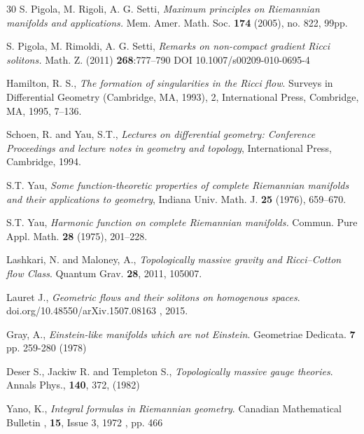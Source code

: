 \documentclass{amsart}
\theoremstyle{plain}
\numberwithin{equation}{section}
\begin{document}
\begin{thebibliography}{30}
S. Pigola, M. Rigoli, A. G. Setti, {\em Maximum
principles on Riemannian manifolds and applications.} Mem. Amer. Math. Soc. \textbf{ 174} (2005), no. 822, 99pp.

S. Pigola, M. Rimoldi, A. G. Setti, {\em Remarks on non-compact gradient Ricci solitons.} Math. Z. (2011) \textbf{268}:777--790 DOI 10.1007/s00209-010-0695-4

Hamilton, R. S., {\em The formation of singularities in the Ricci flow}. Surveys in Differential Geometry (Cambridge, MA, 1993), 2, International Press, Combridge, MA, 1995, 7--136.

Schoen, R. and Yau, S.T., {\em Lectures on differential geometry: Conference Proceedings and lecture notes in geometry and topology}, International Press, Cambridge, 1994.




 S.T. Yau,
{\em Some function-theoretic properties of complete Riemannian manifolds and their applications to geometry},
Indiana Univ. Math. J. \textbf{25} (1976), 659--670.

S.T. Yau, {\em Harmonic function on complete Riemannian manifolds.} Commun. Pure Appl. Math.
\textbf{28} (1975), 201--228.





 Lashkari, N. and Maloney, A., {\em Topologically massive gravity and Ricci–Cotton flow Class}. Quantum Grav. \textbf{28}, 2011, 105007.

 Lauret J., {\em Geometric flows and their solitons on homogenous spaces}. doi.org/10.48550/arXiv.1507.08163
, 2015.

Gray, A., {\em Einstein-like manifolds which are not Einstein}. Geometriae Dedicata. \textbf{7} pp. 259-280 (1978)

Deser S., Jackiw R. and Templeton S., {\em Topologically massive gauge theories}. Annals Phys., \textbf{140},
372, (1982)

Yano, K., {\em  Integral formulas in Riemannian geometry}. Canadian Mathematical Bulletin , \textbf{15}, Issue 3, 1972 , pp. 466




\end{thebibliography}
\end{document}
